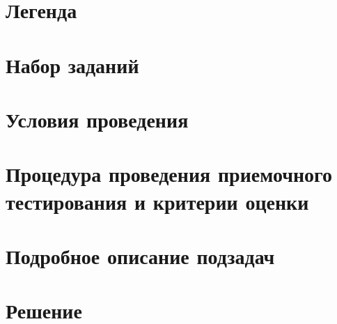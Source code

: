 \section{Легенда}


\section{Набор заданий}


\section{Условия проведения}


\section{Процедура проведения приемочного тестирования и критерии оценки}


\section{Подробное описание подзадач}


\section{Решение}

